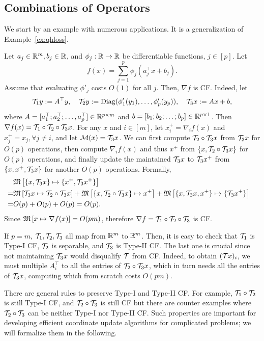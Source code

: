 \subsection{Combinations of Operators}\label{sc:comb}
We start by an example with numerous applications. It is a generalization of Example~\ref{ex:qhloss}.
\begin{example}\label{exp:log-grad} Let $a_j\in \mathbb{R}^m, b_j\in \mathbb{R}$, and $\phi_j:\mathbb{R}\to \mathbb{R}$ be differentiable functions, $j \in [p]$. Let $$f(x)=\sum_{j=1}^p \phi_j(a_j^\top x +b_j).$$ Assume that evaluating $\phi'_j$ costs $O(1)$ for all $j$. Then, $\nabla f$ is CF. Indeed, let $${\mathcal{T}}_1 y:=A^\top y,\quad {\mathcal{T}}_2 y := {\mathrm{Diag}}(\phi_1'(y_1),\ldots,\phi_p'(y_p)), \quad {\mathcal{T}}_3 x := Ax+b,$$ 
where $A=[a_1^\top; a_2^\top; \ldots,a_p^\top]\in \mathbb{R}^{p\times m}$ and $b=[b_1;b_2;\ldots;b_p]\in\mathbb{R}^{p\times 1}$. Then $\nabla f(x)= {\mathcal{T}}_1\circ{\mathcal{T}}_2\circ{\mathcal{T}}_3 x$. For any $x$ and $i\in[m]$, let $x^+_i=\nabla_i f(x)$ and $x^+_j=x_j,\forall j\neq i$, and let ${\mathcal{M}}(x)={\mathcal{T}}_3 x$. We can first compute ${\mathcal{T}}_2\circ{\mathcal{T}}_3 x$ from ${\mathcal{T}}_3 x$ for $O(p)$ operations, then compute $\nabla_i f(x)$ and thus $x^+$ from $\{x, {\mathcal{T}}_2\circ{\mathcal{T}}_3 x\}$ for $O(p)$ operations, and finally update the maintained ${\mathcal{T}}_3 x$ to ${\mathcal{T}}_3 x^+$ from $\{x, x^+,{\mathcal{T}}_3 x\}$ for another $O(p)$ operations. Formally,
\begin{align*}
&\nops{\{x,\cT_3 x\}}{\{x^+, \cT_3x^+\}}\cr
=& \nops{\cT_3x}{\cT_2\circ\cT_3 x}+\nops {\{x,\cT_2\circ\cT_3 x\}}{x^+}+\nops{\{x,\cT_3 x, x^+\}}{\{\cT_3x^+\}}\cr
=& O(p) + O(p) +O(p)=O(p).\nonumber
\end{align*}
Since $\mathfrak{M}\left[{x}\mapsto {\nabla f(x)}\right]=O(pm)$, therefore
$\nabla f= {\mathcal{T}}_1\circ{\mathcal{T}}_2\circ{\mathcal{T}}_3$ is CF. 

If $p=m$, ${\mathcal{T}}_1,{\mathcal{T}}_2,{\mathcal{T}}_3$ all map from $\mathbb{R}^m$ to $\mathbb{R}^m$. Then, it is easy to check that ${\mathcal{T}}_1$ is Type-I CF, ${\mathcal{T}}_2$ is separable, and ${\mathcal{T}}_3$ is Type-II CF. The last one is crucial since not maintaining ${\mathcal{T}}_3 x$ would disqualify ${\mathcal{T}}$ from CF. Indeed, to obtain $({\mathcal{T}} x)_i$, we must multiple $A_i^\top$ to all the entries of ${\mathcal{T}}_2\circ{\mathcal{T}}_3 x$, which in turn needs all the entries of ${\mathcal{T}}_3 x$, computing which from scratch costs $O(pm)$.

There are general rules to preserve Type-I and Type-II CF. For example, ${\mathcal{T}}_1\circ {\mathcal{T}}_2$ is still Type-I CF, and ${\mathcal{T}}_2\circ{\mathcal{T}}_3$ is still CF but there are counter examples where  ${\mathcal{T}}_2\circ{\mathcal{T}}_3$  can be neither Type-I nor Type-II CF. Such properties are important for developing efficient coordinate update algorithms for complicated problems; we will formalize them in the following.
\end{example}


